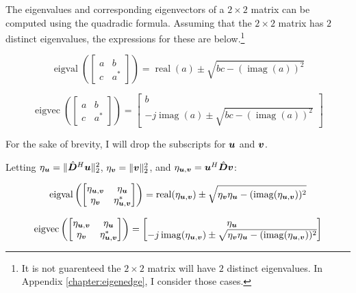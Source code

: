The eigenvalues and corresponding eigenvectors of a $2 \times 2$ matrix can be computed using the quadradic formula. Assuming that the $2 \times 2$ matrix has $2$ distinct eigenvalues, the expressions for these are below.\footnote{It is not guarenteed the $2 \times 2$ matrix will have $2$ distinct eigenvalues. In Appendix \ref{chapter:eigenedge}, I consider those cases.}

\begin{equation}
\operatorname{eigval}\left(\begin{bmatrix} a & b \\ c & a^* \end{bmatrix}\right) = \operatorname{real}(a) \pm \sqrt{bc - (\operatorname{imag}(a))^2}
\end{equation}

\begin{equation}
\operatorname{eigvec}\left(\begin{bmatrix} a & b \\ c & a^* \end{bmatrix}\right) = \begin{bmatrix} b \\ -j\operatorname{imag}(a) \pm \sqrt{bc - (\operatorname{imag}(a))^2}\end{bmatrix}
\end{equation}

For the sake of brevity, I will drop the subscripts for $\bm{u}$ and $\bm{v}$.

Letting $\eta_{\bm{u}} = \|\hat{\bm{D}}^H\bm{u}\|_2^2$, $\eta_{\bm{v}} = \|\bm{v}\|_2^2$, and $\eta_{\bm{u},\bm{v}} = \bm{u}^H\hat{\bm{D}}\bm{v}$:

\begin{equation}
\operatorname{eigval}\left(\begin{bmatrix}
\eta_{\bm{u},\bm{v}} & \eta_{\bm{u}} \\
\eta_{\bm{v}}    & \eta_{\bm{u},\bm{v}}^*
\end{bmatrix}\right)
= \operatorname{real}(\eta_{\bm{u},\bm{v}}) \pm \sqrt{\eta_{\bm{v}}\eta_{\bm{u}} - (\operatorname{imag}(\eta_{\bm{u},\bm{v}}))^2}
\end{equation}

\begin{equation}
\operatorname{eigvec}
\left(\begin{bmatrix}
\eta_{\bm{u},\bm{v}} & \eta_{\bm{u}} \\
\eta_{\bm{v}}    & \eta_{\bm{u},\bm{v}}^*
\end{bmatrix}\right)
= \begin{bmatrix}
\eta_{\bm{u}} \\
-j\operatorname{imag}(\eta_{\bm{u},\bm{v}}) \pm \sqrt{\eta_{\bm{v}}\eta_{\bm{u}} - (\operatorname{imag}(\eta_{\bm{u},\bm{v}}))^2}
\end{bmatrix}
\end{equation}



